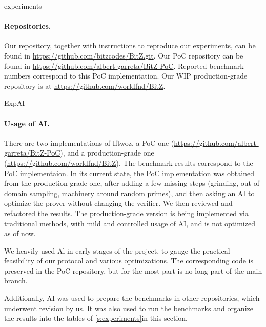 \begin{lncsappendix}{experiments}


\paragraph{Repositories.} \iflncs
Our repository, together with instructions to reproduce our experiments, can be found in \url{https://github.com/bitzcodes/BitZ.git}.
\else %
Our PoC repository can be found in \url{https://github.com/albert-garreta/BitZ-PoC}. Reported benchmark numbers correspond to this PoC implementation. Our WIP production-grade repository is at \url{https://github.com/worldfnd/BitZ}.
\fi

\begin{lncsmove}{ExpAI}
\paragraph{Usage of AI.} There are two implementations of Iftwoz, a PoC one (\url{https://github.com/albert-garreta/BitZ-PoC}), and a production-grade one (\url{https://github.com/worldfnd/BitZ}). The benchmark results correspond to the PoC implementaion. In its current state, the PoC implementation was obtained from the production-grade one, after adding a few missing steps (grinding, out of domain sampling, machinery around random primes), and then asking an AI to optimize the prover without changing the verifier. We then reviewed and refactored the results. The production-grade version is being implemented via traditional methods, with mild and controlled usage of AI, and is not optimized as of now.

We heavily used Al in early stages of the project, to gauge the practical feasibility of our protocol and various optimizations. The corresponding code is preserved in the PoC repository, but for the most part is no long part of the main branch.

\iflncs\else


Additionally, AI was used to prepare the benchmarks in other repositories, which underwent revision by us. It was also used to run the benchmarks and organize the results into the  tables \iflncs of \cref{s:experiments}\else in this section\fi.
\fi
\end{lncsmove}



\end{lncsappendix}
